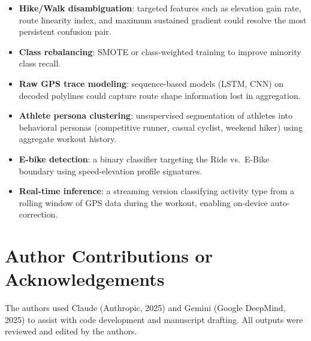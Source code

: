 \documentclass[11pt, onecolumn]{article}
\begin{document}
\begin{itemize}
    \item \textbf{Hike/Walk disambiguation}: targeted features such as elevation gain rate, route linearity index, and maximum sustained gradient could resolve the most persistent confusion pair.
    \item \textbf{Class rebalancing}: SMOTE or class-weighted training to improve minority class recall.
    \item \textbf{Raw GPS trace modeling}: sequence-based models (LSTM, CNN) on decoded polylines could capture route shape information lost in aggregation.
    \item \textbf{Athlete persona clustering}: unsupervised segmentation of athletes into behavioral personas (competitive runner, casual cyclist, weekend hiker) using aggregate workout history.
    \item \textbf{E-bike detection}: a binary classifier targeting the Ride vs.\ E-Bike boundary using speed-elevation profile signatures.
    \item \textbf{Real-time inference}: a streaming version classifying activity type from a rolling window of GPS data during the workout, enabling on-device auto-correction.
\end{itemize}

\section*{Author Contributions or Acknowledgements}
The authors used Claude (Anthropic, 2025) and Gemini (Google DeepMind, 2025) to assist with code development and manuscript drafting. All outputs were reviewed and edited by the authors.


\nocite{*}

\end{document}
